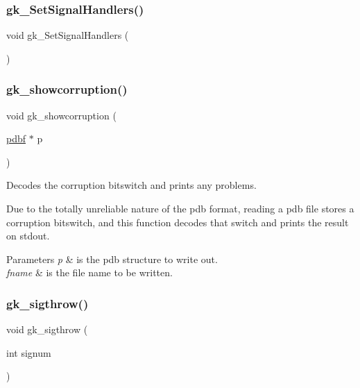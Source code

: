 \subsubsection{\texorpdfstring{gk\+\_\+\+Set\+Signal\+Handlers()}{gk\_SetSignalHandlers()}}
{\footnotesize\ttfamily void gk\+\_\+\+Set\+Signal\+Handlers (\begin{DoxyParamCaption}{ }\end{DoxyParamCaption})}

\mbox{\label{a00077_ac07e046d84d58f44124e9b28e90d619c}} 
\subsubsection{\texorpdfstring{gk\+\_\+showcorruption()}{gk\_showcorruption()}}
{\footnotesize\ttfamily void gk\+\_\+showcorruption (\begin{DoxyParamCaption}\item[{\hyperlink{a00666}{pdbf} $\ast$}]{p }\end{DoxyParamCaption})}



Decodes the corruption bitswitch and prints any problems. 

Due to the totally unreliable nature of the pdb format, reading a pdb file stores a corruption bitswitch, and this function decodes that switch and prints the result on stdout.


\begin{DoxyParams}{Parameters}
{\em p} & is the pdb structure to write out. \\
\hline
{\em fname} & is the file name to be written. \\
\hline
\end{DoxyParams}
\mbox{\label{a00077_ad17d21ff26300b9b5bdb291e8ad2bcef}} 
\subsubsection{\texorpdfstring{gk\+\_\+sigthrow()}{gk\_sigthrow()}}
{\footnotesize\ttfamily void gk\+\_\+sigthrow (\begin{DoxyParamCaption}\item[{int}]{signum }\end{DoxyParamCaption})}

